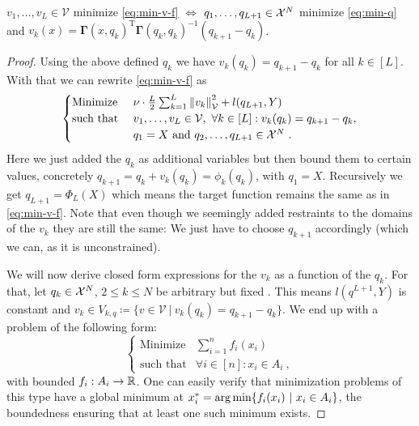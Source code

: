 \begin{theorem}
	$v_1, \ldots, v_L \in \mathcal{V}$ minimize \cref{eq:min-v-f} 
	$\Leftrightarrow$
	$q_1, \ldots, q_{L+1} \in \mathcal{X}^N$ minimize \cref{eq:min-q} and
	$v_k(x) = \mathbf{\Gamma}(x, q_k)^\mathrm{T}\mathbf{\Gamma}(q_k, q_k)^{-1} (q_{k+1} - q_k)$.
\end{theorem}
\begin{proof}
	Using the above defined $q_k$ we have $v_k(q_k) = q_{k+1} - q_k$ for all $k \in [L]$.
	With that we can rewrite \cref{eq:min-v-f} as
	\begin{equation}
		\label{eq:min-q-v}
		\begin{cases}
			\text{Minimize~} & \nu \cdot \frac{L}{2} \sum_{k=1}^{L} \norm{v_k}_\mathcal{V}^2
			+ l(q_{L+1}, Y) \\
			\text{such that~} & v_1, \ldots, v_L \in \mathcal{V},\ \forall k \in [L]: v_k(q_k) = q_{k+1} - q_k, \\
			& q_1 = X \text{~and~} q_2, \ldots, q_{L+1} \in \cX^N \ .
		\end{cases}
	\end{equation}
	Here we just added the $q_k$ as additional variables but then bound them to certain values, concretely $q_{k+1} = q_k + v_k(q_k) = \phi_k(q_k)$, with $q_1 = X$.
	Recursively we get $q_{L+1} = \Phi_L(X)$ which means the target function remains the same as in \cref{eq:min-v-f}.
	Note that even though we seemingly added restraints to the domains of the $v_k$ they are still the same: We just have to choose $q_{k+1}$ accordingly (which we can, as it is unconstrained).
	
	We will now derive closed form expressions for the $v_k$ as a function of the $q_k$.
	For that, let $q_k \in \mathcal{X}^N$, $2 \leq k \leq N$ be arbitrary but fixed .
	This means $l(q^{L+1}, Y)$ is constant and $v_k \in V_{k, q} \coloneqq \{v \in \mathcal{V}~|~ v_k(q_k) = q_{k+1} - q_k\}$.
	We end up with a problem of the following form:
	\begin{equation}
		\begin{cases}
			\text{Minimize} &\sum_{i=1}^n f_i(x_i)\\
			\text{such that} & \forall i \in [n]: x_i \in A_i \ ,
		\end{cases}
	\end{equation}
	with bounded $f_i: A_i \rightarrow \mathbb{R}$.
	One can easily verify that minimization problems of this type have a global minimum at $x_i^\ast = \operatorname*{arg\,min}\{f_i(x_i)~|~ x_i \in A_i\}$, the boundedness ensuring that at least one such minimum exists.


\end{proof}
